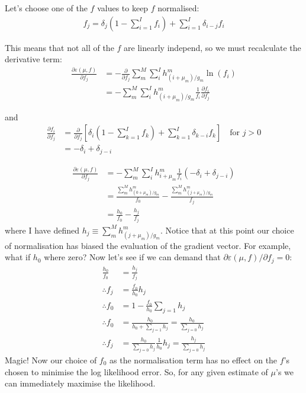 \documentclass[11pt]{article}
\begin{document}
Let's choose one of the $f$ values to keep $f$ normalised:
\begin{align}
   f_j = \delta_{j} (1 - \sum_{i=1}^I f_i) + \sum_{i=1}^I \delta_{i-j} f_i
\end{align}

This means that not all of the $f$ are linearly independ, so we must recalculate the derivative term:
\begin{align}
   \frac{\partial \varepsilon(\mu, f)}{\partial f_j} &= -\frac{\partial}{\partial f_j} \sum_m^M \sum_i^I h^m_{(i+\mu_m)/g_m} \ln(f_i) \\
   &= - \sum_m^M \sum_i^I h^m_{(i+\mu_m)/g_m} \frac{1}{f_i} \frac{\partial f_i}{\partial f_j}
\end{align}

and
\begin{align}
   \frac{\partial f_i}{\partial f_j} &= \frac{\partial }{\partial f_j} \left[ \delta_{i} (1 - \sum_{k=1}^I f_k) + \sum_{k=1}^I \delta_{k-i} f_k \right] \quad \text{for } j > 0 \\
   &= -\delta_{i} + \delta_{j-i}
\end{align}

\begin{align}
   \frac{\partial \varepsilon(\mu, f)}{\partial f_j} &=- \sum_m^M \sum_i^I h^m_{i+\mu_m} \frac{1}{f_i} (-\delta_{i} + \delta_{j-i}) \\
   &= \frac{ \sum_m^M h^m_{(0+\mu_m)/g_m}}{f_0} - \frac{ \sum_m^M h^m_{(j+\mu_m)/g_m}}{f_j} \\
   &= \frac{ h_{0}}{f_0} - \frac{ h_{j}}{f_j}
\end{align}
where I have defined $h_j \equiv \sum_m^M h^m_{(j+\mu_m)/g_m}$. Notice that at this point our choice of normalisation has biased the evaluation of the gradient vector. For example, what if $h_0$ where zero? Now let's see if we can demand that $\partial \varepsilon(\mu, f) / \partial f_j = 0$:
\begin{align}
   \frac{ h_{0}}{f_0} &= \frac{ h_{j}}{f_j} \\
   \therefore f_j &= \frac{f_0}{h_0} h_j \\
   \therefore f_0 &= 1 -  \frac{f_0}{h_0} \sum_{j=1} h_j \\
   \therefore f_0 &= \frac{h_0}{h_0 + \sum_{j=1} h_j} = \frac{h_0}{\sum_{j=0} h_j} \\
   \therefore f_j &= \frac{h_0}{\sum_{j=0} h_j} \frac{1}{h_0} h_j = \frac{h_j}{\sum_{j=0} h_j}
\end{align}
Magic! Now our choice of $f_0$ as the normalisation term has no effect on the $f$'s chosen to minimise the log likelihood error. So, for any given estimate of $\mu$'s we can immediately maximise the likelihood. 
\end{document}
